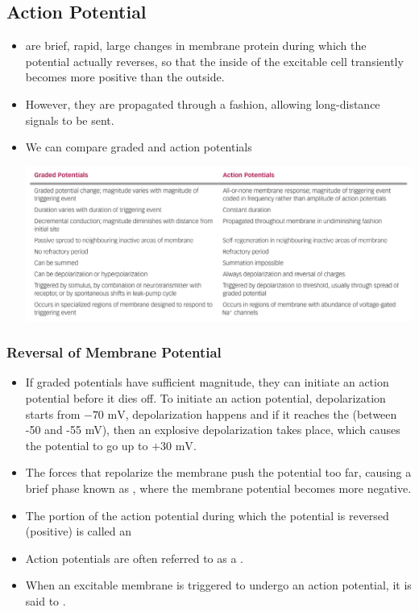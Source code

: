 \documentclass{article}
\numberwithin{equation}{section}
\begin{document}
\subsection{Action Potential}
\begin{itemize}
    \item {} are brief, rapid, large changes in membrane protein during which the potential actually reverses, so that the inside of the excitable cell transiently becomes more positive than the outside.
    \item However, they are propagated through a  fashion, allowing long-distance signals to be sent.
    \item We can compare graded and action potentials 
    \begin{center}
        \includegraphics[width=0.8\linewidth]{figures/comparison.png}
    \end{center}
\end{itemize}
\subsubsection{Reversal of Membrane Potential}
\begin{itemize}
    \item If graded potentials have sufficient magnitude, they can initiate an action potential before it dies off. To initiate an action potential, depolarization starts from $-70\text{ mV}$, depolarization happens and if it reaches the  (between -50 and -55 mV), then an explosive depolarization takes place, which causes the potential to go up to $+30\text{ mV}$.
    \item The forces that repolarize the membrane push the potential too far, causing a brief phase known as , where the membrane potential becomes more negative.
    \item The portion of the action potential during which the potential is reversed (positive) is called an  
    \item Action potentials are often referred to as a .
    \item When an excitable membrane is triggered to undergo an action potential, it is said to .
\end{itemize}
\end{document}
